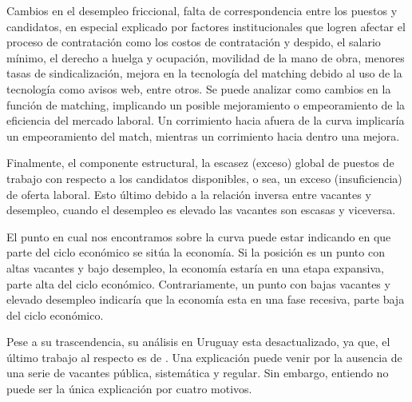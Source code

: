 \documentclass[msc,oneside,a4paper]{udelar} %
\begin{document}
  Cambios en el desempleo friccional, falta de correspondencia entre los puestos y candidatos, en especial explicado por factores institucionales que logren afectar el proceso de contratación como los costos de contratación y despido, el salario mínimo, el derecho a huelga y ocupación, movilidad de la mano de obra, menores tasas de sindicalización, mejora en la tecnología del matching debido al uso de la tecnología como avisos web, entre otros. Se puede analizar como cambios en la función de matching, implicando un posible mejoramiento o empeoramiento de la eficiencia del mercado laboral. Un corrimiento hacia afuera de la curva implicaría un empeoramiento del match, mientras un corrimiento hacia dentro una mejora.
  
  Finalmente, el componente estructural, la escasez (exceso) global de puestos de trabajo con respecto a los candidatos disponibles, o sea, un exceso (insuficiencia) de oferta laboral. Esto último debido a la relación inversa entre vacantes y desempleo, cuando el desempleo es elevado las vacantes son escasas y viceversa.
  
  El punto en cual nos encontramos sobre la curva puede estar indicando en que parte del ciclo económico se sitúa la economía. Si la posición es un punto con altas vacantes y bajo desempleo, la economía estaría en una etapa expansiva, parte alta del ciclo económico. Contrariamente, un punto con bajas vacantes y elevado desempleo indicaría que la economía esta en una fase recesiva, parte baja del ciclo económico.
  
  Pese a su trascendencia, su análisis en Uruguay esta desactualizado, ya que, el último trabajo al respecto es de \cite{Urrestarazu1997}. Una explicación puede venir por la ausencia de una serie de vacantes pública, sistemática y regular. Sin embargo, entiendo no puede ser la única explicación por cuatro motivos.
  
\end{document}
